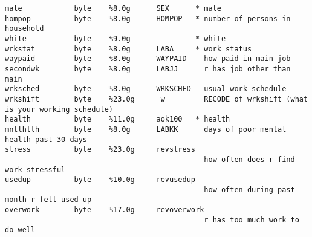 \documentclass[10pt, letterpaper]{article}
\begin{document}
\begin{spacing}{1.4}
{\begin{spacing}{.9}
\begin{verbatim}
male            byte    %8.0g      SEX      * male
hompop          byte    %8.0g      HOMPOP   * number of persons in household
white           byte    %9.0g               * white
wrkstat         byte    %8.0g      LABA     * work status
waypaid         byte    %8.0g      WAYPAID    how paid in main job
secondwk        byte    %8.0g      LABJJ      r has job other than main
wrksched        byte    %8.0g      WRKSCHED   usual work schedule
wrkshift        byte    %23.0g     _w         RECODE of wrkshift (what is your working schedule)
health          byte    %11.0g     aok100   * health
mntlhlth        byte    %8.0g      LABKK      days of poor mental health past 30 days
stress          byte    %23.0g     revstress
                                              how often does r find work stressful
usedup          byte    %10.0g     revusedup
                                              how often during past month r felt used up
overwork        byte    %17.0g     revoverwork
                                              r has too much work to do well


\end{verbatim}
\end{spacing}}
\end{spacing}
\end{document}
